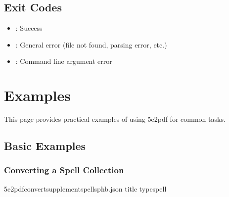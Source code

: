 \documentclass[letterpaper,10pt,english]{sphinxmanual}
\begin{document}
\subsection{Exit Codes}
\label{\detokenize{user-guide/cli-reference:exit-codes}}\begin{itemize}
\item {} 
\sphinxAtStartPar
{}: Success

\item {} 
\sphinxAtStartPar
{}: General error (file not found, parsing error, etc.)

\item {} 
\sphinxAtStartPar
{}: Command line argument error

\end{itemize}

\sphinxstepscope


\section{Examples}
\label{\detokenize{user-guide/examples:examples}}\label{\detokenize{user-guide/examples::doc}}
\sphinxAtStartPar
This page provides practical examples of using 5e2pdf for common tasks.


\subsection{Basic Examples}
\label{\detokenize{user-guide/examples:basic-examples}}

\subsubsection{Converting a Spell Collection}
\label{\detokenize{user-guide/examples:converting-a-spell-collection}}
\begin{sphinxVerbatim}[commandchars=\\\{\}]
5e2pdfconvertsupplementspells\PYGZhy{}phb.json
\PYGZhy{}\PYGZhy{}title
\PYGZhy{}\PYGZhy{}typespell

\end{sphinxVerbatim}
\end{document}
